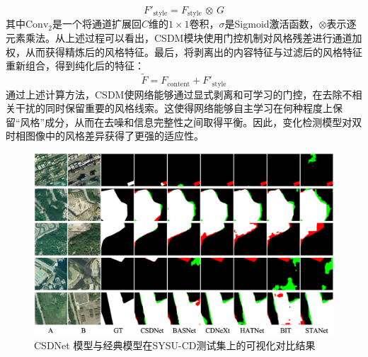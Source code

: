 \begin{equation}
F'_{\mathrm{style}} = F_{\mathrm{style}} \,\otimes\, G
\end{equation}
其中$\mathrm{Conv}_2$是一个将通道扩展回$C$维的$1\times1$卷积，$\sigma$是Sigmoid激活函数，$\otimes$表示逐元素乘法。从上述过程可以看出，CSDM模块使用门控机制对风格残差进行通道加权，从而获得精炼后的风格特征。最后，将剥离出的内容特征与过滤后的风格特征重新组合，得到纯化后的特征：
\begin{equation}
\tilde F = F_{\mathrm{content}} + F'_{\mathrm{style}}
\end{equation}
通过上述计算方法，CSDM使网络能够通过显式剥离和可学习的门控，在去除不相关干扰的同时保留重要的风格线索。这使得网络能够自主学习在何种程度上保留“风格”成分，从而在去噪和信息完整性之间取得平衡。因此，变化检测模型对双时相图像中的风格差异获得了更强的适应性。



\begin{figure}[!htbp]
	\centering
	\includegraphics[width=\textwidth]{paper_figures/基于双时相遥感影像风格解缠和内容细化增强遥感变化检测方法/csdnet_sysu.png}
	\caption{CSDNet 模型与经典模型在SYSU-CD测试集上的可视化对比结果}
	\label{fig:csdnet_sysu}
\end{figure}

